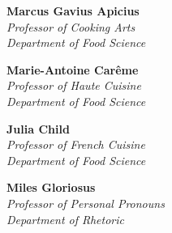 %
%


\NewDocumentCommand\CommitteePageTitle{m}{
	\vspace*{75pt}%
	\IfPackageLoadedTF{microtype}
		{\textls*{\Large\textbf{\MakeUppercase{#1}}}}
		{{\Large\textbf{\MakeUppercase{#1}}}}%
	\pdfbookmark[0]{#1}{Committee}%
	\vspace*{10pt}%
}

\NewDocumentCommand\Role{m}{
	\vspace*{50pt}%
	\IfPackageLoadedTF{microtype}
		{\textls*{\large{\textsc{#1}}}}
		{{\large\textsc{#1}}}%
	\vspace*{12pt}%
}


\begin{flushright}



 \textbf{Marcus Gavius Apicius} \\
 {\itshape
 Professor of Cooking Arts \\
 Department of Food Science \\
 }


 \textbf{Marie-Antoine Carême} \\
 {\itshape
   Professor of Haute Cuisine \\
   Department of Food Science \\[18pt]
 }

 \textbf{Julia Child}\\
 {\itshape
   Professor of French Cuisine \\
   Department of Food Science \\[18pt]
 }

 \textbf{Miles Gloriosus} \\
 {\itshape
   Professor of Personal Pronouns \\
   Department of Rhetoric \\
 }

\end{flushright}

\cleardoublepage
